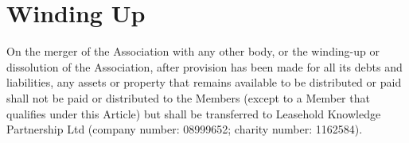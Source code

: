 \documentclass[10pt]{mk-articles-of-association}
\begin{document}

\newpage

\section{Winding Up}

On the merger of the Association with any other body, or the
  winding-up or dissolution of the Association, after provision has
  been made for all its debts and liabilities, any assets or property
  that remains available to be distributed or paid shall not be paid
  or distributed to the Members (except to a Member that qualifies
  under this Article) but shall be transferred to Leasehold Knowledge
  Partnership Ltd (company number: 08999652; charity number: 1162584).
\end{document}
